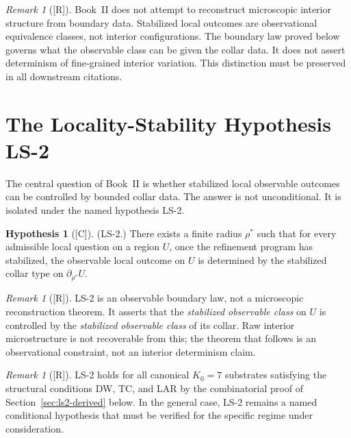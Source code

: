 \documentclass[12pt,oneside]{amsbook}
\theoremstyle{plain}
\theoremstyle{definition}
\newtheorem{hypothesis}[theorem]{Hypothesis}
\theoremstyle{remark}
\newtheorem{remark}[theorem]{Remark}
\newcommand{\status}[1]{\textup{[#1]}}
\begin{document}
\begin{remark}[\status{R}]\label{rmk:observable-not-microscopic}
Book~II does not attempt to reconstruct microscopic interior structure
from boundary data.  Stabilized local outcomes are observational
equivalence classes, not interior configurations.  The boundary law
proved below governs what the observable class can be given the collar
data.  It does not assert determinism of fine-grained interior
variation.  This distinction must be preserved in all downstream
citations.
\end{remark}

\section{The Locality-Stability Hypothesis LS-2}

The central question of Book~II is whether stabilized local observable
outcomes can be controlled by bounded collar data.  The answer is not
unconditional.  It is isolated under the named hypothesis LS-2.

\begin{hypothesis}[\status{C}]\label{hyp:LS2}
\textup{(LS-2.)}  There exists a finite radius $\rho^*$ such that for
every admissible local question on a region $U$, once the refinement
program has stabilized, the observable local outcome on $U$ is
determined by the stabilized collar type on $\partial_{\rho^*} U$.
\end{hypothesis}

\begin{remark}[\status{R}]\label{rmk:ls2-observable}
LS-2 is an observable boundary law, not a microscopic reconstruction
theorem.  It asserts that the \emph{stabilized observable class} on
$U$ is controlled by the \emph{stabilized observable class} of its
collar.  Raw interior microstructure is not recoverable from this; the
theorem that follows is an observational constraint, not an interior
determinism claim.
\end{remark}

\begin{remark}[\status{R}]\label{rmk:ls2-source}
LS-2 holds for all canonical $K_0 = 7$ substrates satisfying the
structural conditions DW, TC, and LAR by the combinatorial proof of
Section~\ref{sec:ls2-derived} below.  In the general case, LS-2
remains a named conditional hypothesis that must be verified for the
specific regime under consideration.
\end{remark}
\end{document}
